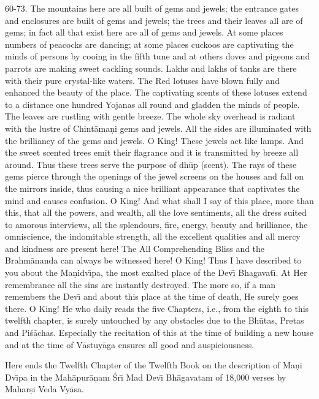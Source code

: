 60-73. The mountains here are all built of gems and jewels; the entrance gates and enclosures are built of gems and jewels; the trees and their leaves all are of gems; in fact all that exist here are all of gems and jewels. At some places numbers of peacocks are dancing; at some places cuckoos are captivating the minds of persons by cooing in the fifth tune and at others doves and pigeons and parrots are making sweet cackling sounds. Lakhs and lakhs of tanks are there with their pure crystal-like waters. The Red lotuses have blown fully and enhanced the beauty of the place. The captivating scents of these lotuses extend to a distance one hundred Yojanas all round and gladden the minds of people. The leaves are rustling with gentle breeze. The whole sky overhead is radiant with the lustre of Chint\=ama\d{n}i gems and jewels. All the sides are illuminated with the brilliancy of the gems and jewels. O King! These jewels act like lamps. And the sweet scented trees emit their flagrance and it is transmitted by breeze all around. Thus these trees serve the purpose of dh\=up (scent). The rays of these gems pierce through the openings of the jewel screens on the houses and fall on the mirrors inside, thus causing a nice brilliant appearance that captivates the mind and causes confusion. O King! And what shall I say of this place, more than this, that all the powers, and wealth, all the love sentiments, all the dress suited to amorous interviews, all the splendours, fire, energy, beauty and brilliance, the omniscience, the indomitable strength, all the excellent qualities and all mercy and kindness are present here! The All Comprehending Bliss and the Brahm\=ananda can always be witnessed here! O King! Thus I have described to you about the Ma\d{n}idv\={\i}pa, the most exalted place of the Dev\={\i} Bhagavat\={\i}. At Her remembrance all the sins are instantly destroyed. The more so, if a man remembers the Dev\={\i} and about this place at the time of death, He surely goes there. O King! He who daily reads the five Chapters, i.e., from the eighth to this twelfth chapter, is surely untouched by any obstacles due to the Bh\=utas, Pretas and Pi\'s\=achas. Especially the recitation of this at the time of building a new house and at the time of V\=astuy\=aga ensures all good and auspiciousness.

Here ends the Twelfth Chapter of the Twelfth Book on the description of Ma\d{n}i Dv\={\i}pa in the Mah\=apur\=a\d{n}am \'Sr\={\i} Mad Dev\={\i} Bh\=agavatam of 18,000 verses by Mahar\d{s}i Veda Vy\=asa.



